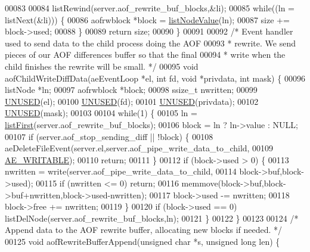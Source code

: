 \begin{DoxyCode}
00083 
00084     listRewind(server.aof\_rewrite\_buf\_blocks,&li);
00085     \textcolor{keywordflow}{while}((ln = listNext(&li))) \{
00086         aofrwblock *block = \hyperlink{adlist_8h_af84cae230e7180ebcda1e2736fce9f65}{listNodeValue}(ln);
00087         size += block->used;
00088     \}
00089     \textcolor{keywordflow}{return} size;
00090 \}
00091 
00092 \textcolor{comment}{/* Event handler used to send data to the child process doing the AOF}
00093 \textcolor{comment}{ * rewrite. We send pieces of our AOF differences buffer so that the final}
00094 \textcolor{comment}{ * write when the child finishes the rewrite will be small. */}
00095 \textcolor{keywordtype}{void} aofChildWriteDiffData(aeEventLoop *el, \textcolor{keywordtype}{int} fd, \textcolor{keywordtype}{void} *privdata, \textcolor{keywordtype}{int} mask) \{
00096     listNode *ln;
00097     aofrwblock *block;
00098     ssize\_t nwritten;
00099     \hyperlink{server_8h_ae7c9dc8f13568a9c856573751f1ee1ec}{UNUSED}(el);
00100     \hyperlink{server_8h_ae7c9dc8f13568a9c856573751f1ee1ec}{UNUSED}(fd);
00101     \hyperlink{server_8h_ae7c9dc8f13568a9c856573751f1ee1ec}{UNUSED}(privdata);
00102     \hyperlink{server_8h_ae7c9dc8f13568a9c856573751f1ee1ec}{UNUSED}(mask);
00103 
00104     \textcolor{keywordflow}{while}(1) \{
00105         ln = \hyperlink{adlist_8h_aa8dc514bbe217bb2e87c1c77cfa84690}{listFirst}(server.aof\_rewrite\_buf\_blocks);
00106         block = ln ? ln->value : NULL;
00107         \textcolor{keywordflow}{if} (server.aof\_stop\_sending\_diff || !block) \{
00108             aeDeleteFileEvent(server.el,server.aof\_pipe\_write\_data\_to\_child,
00109                               \hyperlink{ae_8h_ab6bfb0366ccb6277112d132c2a2bf500}{AE\_WRITABLE});
00110             \textcolor{keywordflow}{return};
00111         \}
00112         \textcolor{keywordflow}{if} (block->used > 0) \{
00113             nwritten = write(server.aof\_pipe\_write\_data\_to\_child,
00114                              block->buf,block->used);
00115             \textcolor{keywordflow}{if} (nwritten <= 0) \textcolor{keywordflow}{return};
00116             memmove(block->buf,block->buf+nwritten,block->used-nwritten);
00117             block->used -= nwritten;
00118             block->free += nwritten;
00119         \}
00120         \textcolor{keywordflow}{if} (block->used == 0) listDelNode(server.aof\_rewrite\_buf\_blocks,ln);
00121     \}
00122 \}
00123 
00124 \textcolor{comment}{/* Append data to the AOF rewrite buffer, allocating new blocks if needed. */}
00125 \textcolor{keywordtype}{void} aofRewriteBufferAppend(\textcolor{keywordtype}{unsigned} \textcolor{keywordtype}{char} *s, \textcolor{keywordtype}{unsigned} \textcolor{keywordtype}{long} len) \{

\end{DoxyCode}
